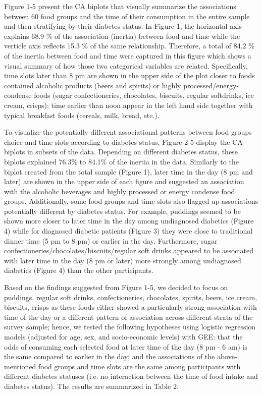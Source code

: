 \documentclass{bmcart}
\def\texttt{[image: ]}
\begin{document}
Figure 1-5 present the CA biplots that visually summarize the associations between 60 food groups and the time of their consumption in the entire sample and then stratifying by their diabetes status. In Figure 1, the horizontal axis explains 68.9 \% of the association (inertia) between food and time while the verticle axis reflects 15.3 \% of the same relationship. Therefore, a total of 84.2 \% of the inertia between food and time were captured in this figure which shows a visual summary of how those two categorical variables are related. Specifically, time slots later than 8 pm are shown in the upper side of the plot closer to foods contained alcoholic products (beers and spirits) or highly processed/energy-condense foods (sugar confectioneries, chocolates, biscuits, regular softdrinks, ice cream, crisps); time earlier than  noon appear in the left hand side together with typical breakfast foods (cereals, milk, bread, etc.).



To visualize the potentially different associational patterns between food groups choice and time slots according to diabetes status, Figure 2-5 display the CA biplots in subsets of the data. Depending on different diabetes status, these biplots explained 76.3\% to 84.1\% of the inertia in the data. Similarly to the biplot created from the total sample (Figure 1), later time in the day (8 pm and later) are shown in the upper side of each figure and suggested an association with the alcoholic beverages and highly processed or energy condense food groups. Additionally, some food groups and time slots also flagged up associations potentially different by diabetes status. For example, puddings seemed to be shown more closer to later time in the day among undiagnosed diabetics (Figure 4) while for diagnosed diabetic patients (Figure 3) they were close to traditional dinner time (5 pm to 8 pm) or earlier in the day. Furthermore, sugar confectioneries/chocolates/biscuits/regular soft drinks appeared to be associated with later time in the day (8 pm or later) more strongly among undiagnosed diabetics (Figure 4) than the other participants.

Based on the findings suggested from Figure 1-5, we decided to focus on puddings, regular soft drinks, confectioneries, chocolates, spirits, beers, ice cream, biscuits, crisps as these foods either showed a particularly strong association with time of the day or a different pattern of association across different strata of the survey sample; hence, we tested the following hypotheses using logistic regression models (adjusted for age, sex, and socio-economic levels) with GEE: that the odds of consuming each selected food at later time of the day (8 pm - 6 am) is the same compared to earlier in the day; and the associations of the above-mentioned food groups and time slots are the same among participants with different diabetes statuses (i.e. no interaction between the time of food intake and diabetes status). The results are summarized in Table 2. 
\end{document}
